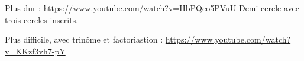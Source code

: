 \begin{exo}
Plus dur : \url{https://www.youtube.com/watch?v=HbPQco5PVuU}
Demi-cercle avec trois cercles inscrits.
\begin{center}
\begin{tikzpicture}
\end{tikzpicture}
\end{center}
\end{exo}


Plus difficile, avec trinôme et factoriastion : 
\url{https://www.youtube.com/watch?v=KKzf3vh7-pY}




\indications
\correction



